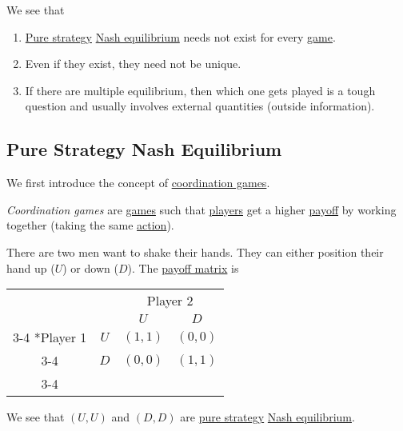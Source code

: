 \begin{remark}
	We see that
	\begin{enumerate}
		\item \hyperref[def:pure-strategy]{Pure strategy} \hyperref[def:Nash-equilibrium]{Nash equilibrium} needs not exist for every \hyperref[def:mathematical-game]{game}.
		\item Even if they exist, they need not be unique.
		\item If there are multiple equilibrium, then which one gets played is a tough question and usually involves external quantities (outside information).
	\end{enumerate}
\end{remark}

\subsection{Pure Strategy Nash Equilibrium}
We first introduce the concept of \hyperref[def:coordination-game]{coordination games}.

\begin{definition}\label{def:coordination-game}
	\emph{Coordination games} are \hyperref[def:game]{games} such that \hyperref[def:player]{players} get a higher \hyperref[def:reward]{payoff} by working together (taking the same \hyperref[def:strategy]{action}).
\end{definition}

\begin{eg}\label{eg:shaking-hands}
	There are two men want to shake their hands. They can either position their hand up (\(U\)) or down (\(D\)). The \hyperref[def:payoff-matrix]{payoff matrix} is
	\begin{table}[H]
		\centering
		\setlength{\extrarowheight}{2pt}
		\begin{tabular}{cc|c|c|}
			                        & \multicolumn{1}{c}{} & \multicolumn{2}{c}{Player 2}                           \\
			                        & \multicolumn{1}{c}{} & \multicolumn{1}{c}{$U$}      & \multicolumn{1}{c}{$D$} \\\cline{3-4}
			\multirow{2}*{Player 1} & $U$                  & $(1, 1)$                     & $(0, 0)$                \\\cline{3-4}
			                        & $D$                  & $(0, 0)$                     & $(1, 1)$                \\\cline{3-4}
		\end{tabular}
	\end{table}
	We see that \((U, U)\) and \((D, D)\) are \hyperref[def:pure-strategy]{pure strategy} \hyperref[def:Nash-equilibrium]{Nash equilibrium}.
\end{eg}

